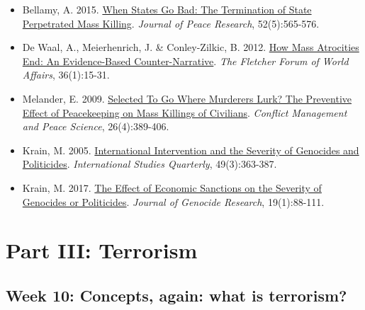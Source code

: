 \documentclass[12pt,]{article}
\providecommand{\tightlist}{%
  \setlength{\itemsep}{0pt}\setlength{\parskip}{0pt}}
\begin{document}
\begin{itemize}
\tightlist
\item
  Bellamy, A. 2015.
  \href{http://journals.sagepub.com/doi/abs/10.1177/0022343315569333}{When
  States Go Bad: The Termination of State Perpetrated Mass Killing}.
  \emph{Journal of Peace Research}, 52(5):565-576.
\item
  De Waal, A., Meierhenrich, J. \& Conley-Zilkic, B. 2012.
  \href{http://heinonline.org/HOL/LandingPage?handle=hein.journals/forwa36\&div=7\&id=\&page=}{How
  Mass Atrocities End: An Evidence-Based Counter-Narrative}. \emph{The
  Fletcher Forum of World Affairs}, 36(1):15-31.
\item
  Melander, E. 2009.
  \href{http://journals.sagepub.com/doi/abs/10.1177/0738894209106482}{Selected
  To Go Where Murderers Lurk? The Preventive Effect of Peacekeeping on
  Mass Killings of Civilians}. \emph{Conflict Management and Peace
  Science}, 26(4):389-406.
\item
  Krain, M. 2005.
  \href{https://academic.oup.com/isq/article/49/3/363/1934221}{International
  Intervention and the Severity of Genocides and Politicides}.
  \emph{International Studies Quarterly}, 49(3):363-387.
\item
  Krain, M. 2017.
  \href{https://www.tandfonline.com/doi/abs/10.1080/14623528.2016.1240516}{The
  Effect of Economic Sanctions on the Severity of Genocides or
  Politicides}. \emph{Journal of Genocide Research}, 19(1):88-111.
\end{itemize}

\hypertarget{part-iii-terrorism}{%
\section{Part III: Terrorism}\label{part-iii-terrorism}}

\hypertarget{week-10-concepts-again-what-is-terrorism}{%
\subsection{Week 10: Concepts, again: what is
terrorism?}\label{week-10-concepts-again-what-is-terrorism}}
\end{document}
